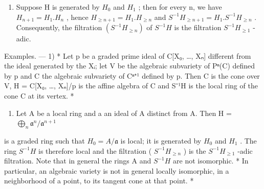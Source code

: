 \begin{enumerate}
\def\labelenumi{\arabic{enumi})}
\setcounter{enumi}{1}
\tightlist
\item
  Suppose H is generated by \(H_{0}\) and \(H_{1}\) ; then for every n, we have \(H_{n+1} = H_{1}.H_{n}\) , hence \(H_{\geqslant n+1} = H_{1}.H_{\geqslant n}\) and \(S^{-1}H_{\geqslant n+1} = H_{1}.S^{-1}H_{\geqslant n}\) . Consequently, the filtration \((S^{-1}H_{\geqslant n})\) of \(S^{-1}H\) is the filtration \(S^{-1}H_{\geqslant 1}\) -adic.
\end{enumerate}

Examples. --- 1) * Let p be a graded prime ideal of C{[}X₀, \ldots, Xₙ{]} different from the ideal generated by the Xᵢ; let V be the algebraic subvariety of Pⁿ(C) defined by p and C the algebraic subvariety of Cⁿ⁺¹ defined by p. Then C is the cone over V, H = C{[}X₀, \ldots, Xₙ{]}/p is the affine algebra of C and S⁻¹H is the local ring of the cone C at its vertex. *

\begin{enumerate}
\def\labelenumi{\arabic{enumi})}
\setcounter{enumi}{1}
\tightlist
\item
  Let A be a local ring and a an ideal of A distinct from A. Then H = \(\bigoplus_{n} \mathfrak{a}^{n}/\mathfrak{a}^{n+1}\)
\end{enumerate}

is a graded ring such that \(H_{0} = A/\mathfrak{a}\) is local; it is generated by \(H_{0}\) and \(H_{1}\) . The ring \(S^{-1}H\) is therefore local and the filtration ( \(S^{-1}H_{\geq n}\) ) is the \(S^{-1}H_{\geq 1}\) -adic filtration. Note that in general the rings A and \(S^{-1}H\) are not isomorphic. * In particular, an algebraic variety is not in general locally isomorphic, in a neighborhood of a point, to its tangent cone at that point. *

